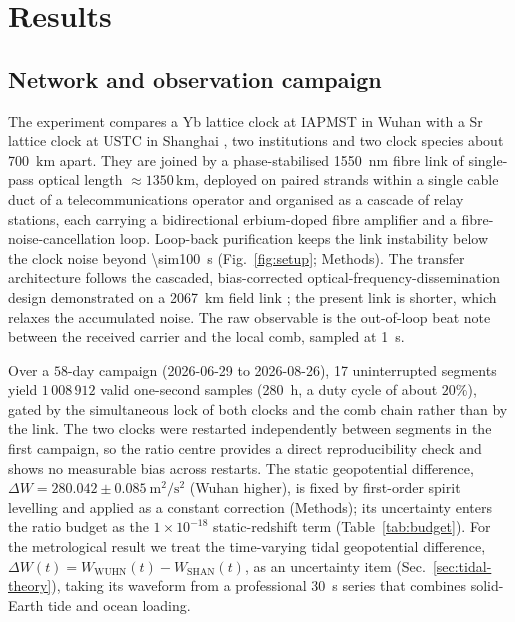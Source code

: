 \documentclass[11pt,a4paper]{article}
\newcommand{\dW}{\Delta W}
\newcommand{\e}[1]{\times 10^{#1}}
\begin{document}
\section{Results}

\subsection{Network and observation campaign}
\label{sec:network}

The experiment compares a Yb lattice clock at IAPMST in Wuhan
\citep{zhu2026yb} with a Sr lattice clock at USTC in Shanghai
\citep{jia2026sr}, two institutions and two clock
species about \qty{700}{km} apart. They are joined by a phase-stabilised
\qty{1550}{nm} fibre link of single-pass optical length $\approx1350$\,km,
deployed on paired strands within a single cable duct of a
telecommunications operator and organised as a cascade of relay stations,
each carrying a bidirectional erbium-doped fibre amplifier and a
fibre-noise-cancellation loop. Loop-back purification keeps the link
instability below the clock noise beyond \qty{\sim100}{s}
(Fig.~\ref{fig:setup}; Methods). The transfer architecture follows the
cascaded, bias-corrected optical-frequency-dissemination design
demonstrated on a \qty{2067}{km} field link \citep{chen2026dissemination}; the
present link is shorter, which relaxes the accumulated noise. The raw
observable is the out-of-loop beat note between the received carrier and
the local comb, sampled at \qty{1}{s}.

{\sloppy
Over a $58$-day campaign (2026-06-29 to 2026-08-26), 17 uninterrupted
segments yield $1\,008\,912$ valid one-second samples (\qty{280}{h}, a duty
cycle of about $20\%$), gated by the simultaneous lock of both clocks
and the comb chain rather than by the link. The two clocks were
restarted independently between segments in the first campaign, so the
ratio centre provides a direct reproducibility check and shows no
measurable bias across restarts. The static geopotential difference,
$\dW = 280.042\pm0.085\ \mathrm{m^{2}/s^{2}}$ (Wuhan higher), is fixed
by first-order spirit levelling and applied as a constant correction
(Methods); its uncertainty enters the ratio budget as the $1\e{-18}$
static-redshift term (Table~\ref{tab:budget}). For the metrological
result we treat the time-varying tidal geopotential difference,
$\dW(t) = W_{\mathrm{WUHN}}(t) - W_{\mathrm{SHAN}}(t)$, as an
uncertainty item (Sec.~\ref{sec:tidal-theory}), taking its waveform
from a professional \qty{30}{s} series that combines solid-Earth tide and
ocean loading.
\par}
\end{document}

